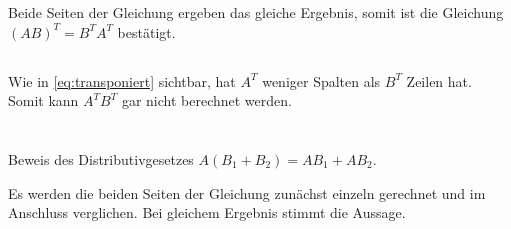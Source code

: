 \documentclass[10pt,a4paper,oneside,ngerman,numbers=noenddot]{scrartcl}
\begin{document}
Beide Seiten der Gleichung ergeben das gleiche Ergebnis, somit ist die Gleichung $(AB)^{T} = B^{T}A^{T}$ bestätigt.

\subsection{} %
Wie in \eqref{eq:transponiert} sichtbar, hat $A^{T}$ weniger Spalten als $B^{T}$ Zeilen hat. Somit kann $A^{T}B^{T}$ gar nicht berechnet werden.
\section{} %
Beweis des Distributivgesetzes $A(B_{1} + B_{2}) = AB_{1} + AB_{2}$.

Es werden die beiden Seiten der Gleichung zunächst einzeln gerechnet und im Anschluss verglichen. Bei gleichem Ergebnis stimmt die Aussage.
\end{document}

